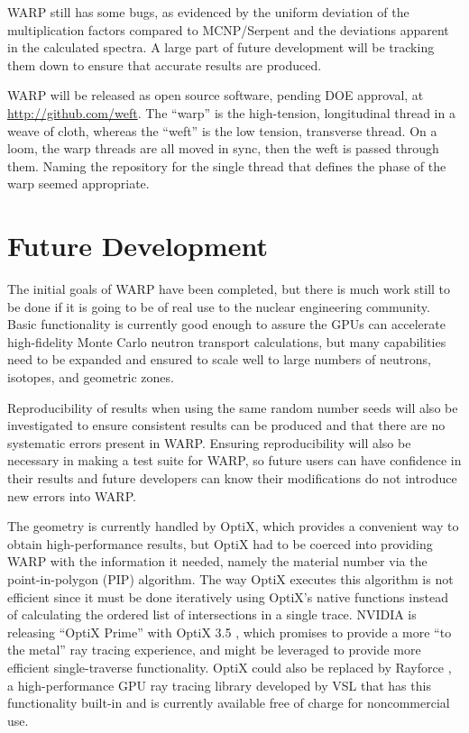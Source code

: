 \documentclass[preprint,12pt]{elsarticle}
\begin{document}
WARP still has some bugs, as evidenced by the uniform deviation of the multiplication factors compared to MCNP/Serpent and the deviations apparent in the calculated spectra.  A large part of future development will be tracking them down to ensure that accurate results are produced.

WARP will be released as open source software, pending DOE approval, at \url{http://github.com/weft}. The ``warp'' is the high-tension, longitudinal thread in a weave of cloth, whereas the ``weft'' is the low tension, transverse thread.  On a loom, the warp threads are all moved in sync, then the weft is passed through them.  Naming the repository for the single thread that defines the phase of the warp seemed appropriate.

\section{Future Development}
\label{sec:dev}

The initial goals of WARP have been completed, but there is much work still to be done if it is going to be of real use to the nuclear engineering community.  Basic functionality is currently good enough to assure the GPUs can accelerate high-fidelity Monte Carlo neutron transport calculations, but many capabilities need to be expanded and ensured to scale well to large numbers of neutrons, isotopes, and geometric zones.  

Reproducibility of results when using the same random number seeds will also be investigated to ensure consistent results can be produced and that there are no systematic errors present in WARP.  Ensuring reproducibility will also be necessary in making a test suite for WARP, so future users can have confidence in their results and future developers can know their modifications do not introduce new errors into WARP.

The geometry is currently handled by OptiX, which provides a convenient way to obtain high-performance results, but OptiX had to be coerced into providing WARP with the information it needed, namely the material number via the point-in-polygon (PIP) algorithm.  The way OptiX executes this algorithm is not efficient since it must be done iteratively using OptiX's native functions instead of calculating the ordered list of intersections in a single trace.  NVIDIA is releasing ``OptiX Prime'' with OptiX 3.5 \cite{optix3.5}, which promises to provide a more ``to the metal'' ray tracing experience, and might be leveraged to provide more efficient single-traverse functionality.  OptiX could also be replaced by Rayforce \cite{rayforce}, a high-performance GPU ray tracing library developed by VSL that has this functionality built-in and is currently available free of charge for noncommercial use.
\end{document}
